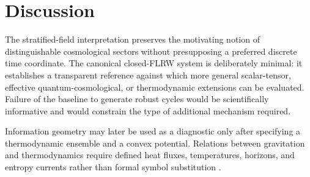 \section{Discussion}
\label{sec:discussion}

The stratified-field interpretation preserves the motivating notion of distinguishable cosmological sectors without presupposing a preferred discrete time coordinate. The canonical closed-FLRW system is deliberately minimal: it establishes a transparent reference against which more general scalar-tensor, effective quantum-cosmological, or thermodynamic extensions can be evaluated. Failure of the baseline to generate robust cycles would be scientifically informative and would constrain the type of additional mechanism required.

Information geometry may later be used as a diagnostic only after specifying a thermodynamic ensemble and a convex potential. Relations between gravitation and thermodynamics require defined heat fluxes, temperatures, horizons, and entropy currents rather than formal symbol substitution \citep{jacobson1995thermodynamics,ruppeiner1979thermodynamics}.
